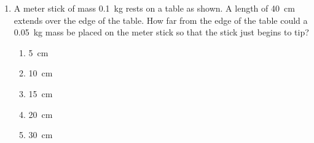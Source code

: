 \documentclass{../../../oss-classkick}
\begin{document}
\genheader


\genmultidirections

\gengravity

\raggedcolumns
\begin{multicols*}{2}
  \begin{enumerate}[leftmargin=18pt]

    
  \item A meter stick of mass \SI{.1}{\kilo\gram} rests on a table as shown. A
    length of \SI{40}{\centi\metre} extends over the edge of the table. How far
    from the edge of the table could a \SI{.05}{\kilo\gram} mass be placed on
    the meter stick so that the stick just begins to tip?
    \begin{center}
    \end{center}
    \begin{enumerate}[nosep,leftmargin=18pt,label=(\Alph*)]
    \item\SI{5}{\centi\metre}
    \item\SI{10}{\centi\metre}
    \item\SI{15}{\centi\metre}
    \item\SI{20}{\centi\metre}
    \item\SI{30}{\centi\metre}
    \end{enumerate}
    

\end{enumerate}
\end{multicols*}
\end{document}
